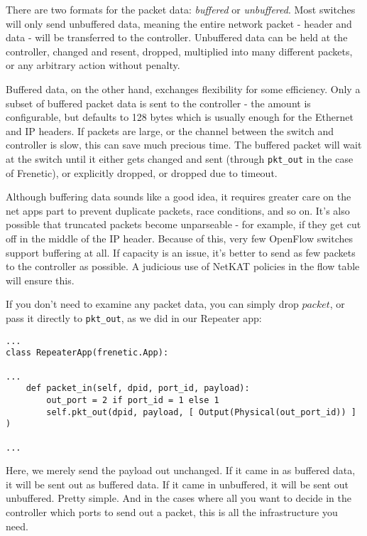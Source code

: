 \bigskip
There are two formats for the packet data: \emph{buffered} or \emph{unbuffered}.
Most switches will only send unbuffered data, meaning the entire network packet - header and data - will be 
transferred to the controller.
Unbuffered data can be held at the controller, changed and resent, dropped, multiplied into many different packets, or 
any arbitrary action without penalty.  

Buffered data, on the other hand, exchanges flexibility for some efficiency.
Only a subset of buffered packet data is sent to the controller - the amount is configurable, but defaults to 128 bytes which is usually enough for the Ethernet and IP headers.  
If packets are large, or the channel between the switch and controller is slow, this can save much precious time.
The buffered packet will wait at the switch until it either gets changed and sent (through \texttt{pkt\_out} in 
the case of Frenetic), or explicitly dropped, or dropped due to timeout.  

Although buffering data sounds like a good idea, it requires greater care on the net apps part to prevent
duplicate packets, race conditions, and so on.
It's also possible that truncated packets become unparseable - for example, if they get cut off in the middle of
the IP header.
Because of this, very few OpenFlow switches support buffering at all.  
If capacity is an issue, it's better to send as few packets to the controller as possible.
A judicious use of NetKAT policies in the flow table will ensure this.  

If you don't need to examine any packet data, you can simply drop $packet$, or pass it directly to \texttt{pkt\_out},
as we did in our Repeater app:

\begin{lstlisting}
...
class RepeaterApp(frenetic.App):

...
    def packet_in(self, dpid, port_id, payload):
        out_port = 2 if port_id = 1 else 1
        self.pkt_out(dpid, payload, [ Output(Physical(out_port_id)) ] )

...
\end{lstlisting}

Here, we merely send the payload out unchanged.  
If it came in as buffered data, it will be sent out as buffered data.
If it came in unbuffered, it will be sent out unbuffered.  
Pretty simple.
And in the cases where all you want to decide in the controller which ports to send out a packet, this
is all the infrastructure you need.

